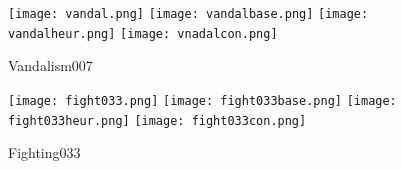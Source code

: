 \documentclass[sigplan,authorversion,nonacm, 9pt]{acmart}
\begin{document}
\begin{figure*}[h]
    \centering
    \begin{minipage}[b]{\textwidth}
        \centering
        \texttt{[image: vandal.png]}
        \texttt{[image: vandalbase.png]}
        \texttt{[image: vandalheur.png]}
        \texttt{[image: vnadalcon.png]}
        \caption{Vandalism007}
        \label{fig:vandalism007}
    \end{minipage}
\end{figure*}
\begin{figure*}[h]
    \centering
    \begin{minipage}[b]{\textwidth}
        \centering
        \texttt{[image: fight033.png]}
        \texttt{[image: fight033base.png]}
        \texttt{[image: fight033heur.png]}
        \texttt{[image: fight033con.png]}
        \caption{Fighting033}
        \label{fig:fighting033}
    \end{minipage}
\end{figure*}
\end{document}
